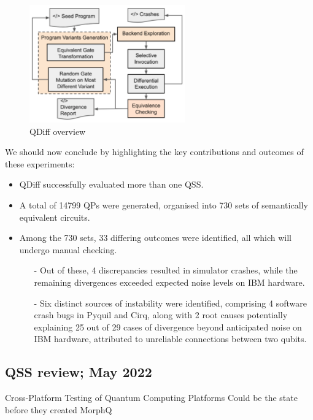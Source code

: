 \begin{itemize}
    \begin{figure}[H]
        \centering
        \includegraphics[width=0.6\textwidth]{TFM/photos/QDiffWorkoverflow.png}
        \caption{QDiff overview \cite{wang2021qdiff}} 
        \label{Fig:QDiffWorkOverflow}
    \end{figure}

    We should now conclude by highlighting the key contributions and outcomes of these experiments:

\begin{itemize}
    \item QDiff successfully evaluated more than one QSS.
    \item A total of 14799 QPs were generated, organised into 730 sets of semantically equivalent circuits.
    \item Among the 730 sets, 33 differing outcomes were identified, all which will undergo manual checking.
    \begin{itemize}
        \item[-] Out of these, 4 discrepancies resulted in simulator crashes, while the remaining divergences exceeded expected noise levels on IBM hardware.
        \item[-] Six distinct sources of instability were identified, comprising 4 software crash bugs in Pyquil and Cirq, along with 2 root causes potentially explaining 25 out of 29 cases of divergence beyond anticipated noise on IBM hardware, attributed to unreliable connections between two qubits.
    \end{itemize}
    
\end{itemize}

\vspace{15pt}
\subsection{QSS review; May 2022}
Cross-Platform Testing of Quantum Computing Platforms \cite{paltenghi2022cross}
Could be the state before they created MorphQ


\end{itemize}
